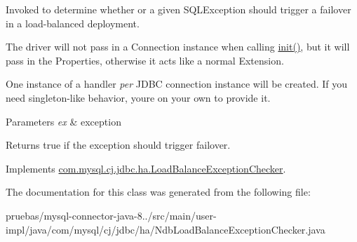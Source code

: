 Invoked to determine whether or a given S\+Q\+L\+Exception should trigger a failover in a load-\/balanced deployment.

The driver will not pass in a Connection instance when calling \mbox{\hyperlink{classcom_1_1mysql_1_1cj_1_1jdbc_1_1ha_1_1_standard_load_balance_exception_checker_af2f4516746c3615d1a4f3a191805b374}{init()}}, but it will pass in the Properties, otherwise it acts like a normal Extension.

One instance of a handler {\itshape per} J\+D\+BC connection instance will be created. If you need singleton-\/like behavior, you\textquotesingle{}re on your own to provide it.


\begin{DoxyParams}{Parameters}
{\em ex} & exception \\
\hline
\end{DoxyParams}
\begin{DoxyReturn}{Returns}
true if the exception should trigger failover. 
\end{DoxyReturn}


Implements \mbox{\hyperlink{interfacecom_1_1mysql_1_1cj_1_1jdbc_1_1ha_1_1_load_balance_exception_checker_a5d8bf713d492a85c62b52278437c4e60}{com.\+mysql.\+cj.\+jdbc.\+ha.\+Load\+Balance\+Exception\+Checker}}.



The documentation for this class was generated from the following file\+:\begin{DoxyCompactItemize}
\item 
pruebas/mysql-\/connector-\/java-\/8../src/main/user-\/impl/java/com/mysql/cj/jdbc/ha/Ndb\+Load\+Balance\+Exception\+Checker.\+java\end{DoxyCompactItemize}
